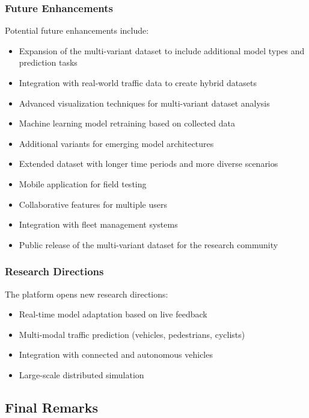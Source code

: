 \subsubsection{Future Enhancements}
Potential future enhancements include:
\begin{itemize}
    \item Expansion of the multi-variant dataset to include additional model types and prediction tasks
    \item Integration with real-world traffic data to create hybrid datasets
    \item Advanced visualization techniques for multi-variant dataset analysis
    \item Machine learning model retraining based on collected data
    \item Additional variants for emerging model architectures
    \item Extended dataset with longer time periods and more diverse scenarios
    \item Mobile application for field testing
    \item Collaborative features for multiple users
    \item Integration with fleet management systems
    \item Public release of the multi-variant dataset for the research community
\end{itemize}

\subsubsection{Research Directions}
The platform opens new research directions:
\begin{itemize}
    \item Real-time model adaptation based on live feedback
    \item Multi-modal traffic prediction (vehicles, pedestrians, cyclists)
    \item Integration with connected and autonomous vehicles
    \item Large-scale distributed simulation
\end{itemize}

\subsection{Final Remarks}

